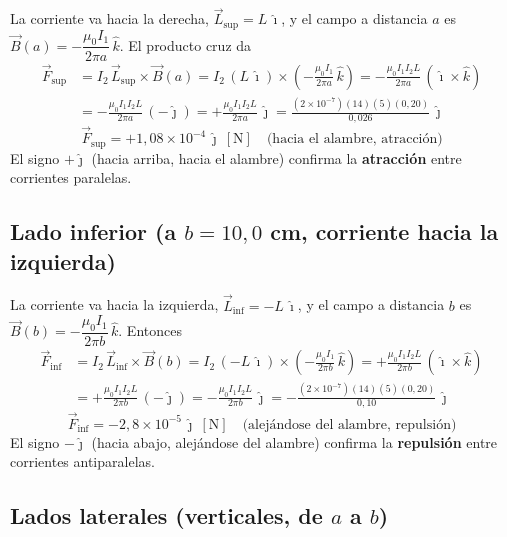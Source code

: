 \documentclass[12pt,letterpaper]{article}
\begin{document}
La corriente va hacia la derecha, $\vec{L}_{\text{sup}}=L\,\hat{\imath}$, y el campo a distancia
$a$ es $\vec{B}(a)=-\dfrac{\mu_0 I_1}{2\pi a}\,\hat{k}$. El producto cruz da
\begin{align*}
    \vec{F}_{\text{sup}} &= I_2\,\vec{L}_{\text{sup}}\times\vec{B}(a)
    = I_2\,(L\,\hat{\imath})\times\!\left(-\frac{\mu_0 I_1}{2\pi a}\,\hat{k}\right)
    = -\frac{\mu_0 I_1 I_2 L}{2\pi a}\,(\hat{\imath}\times\hat{k}) \\[2pt]
    &= -\frac{\mu_0 I_1 I_2 L}{2\pi a}\,(-\hat{\jmath})
    = +\frac{\mu_0 I_1 I_2 L}{2\pi a}\,\hat{\jmath}
    = \frac{(2\times10^{-7})(14)(5)(0{,}20)}{0{,}026}\,\hat{\jmath}
\end{align*}
\[
    \boxed{\vec{F}_{\text{sup}} = +1{,}08\times10^{-4}\,\hat{\jmath}\ [\text{N}]\quad\text{(hacia el alambre, atracci\'on)}}
\]
El signo $+\hat{\jmath}$ (hacia arriba, hacia el alambre) confirma la \textbf{atracci\'on} entre
corrientes paralelas.

\subsection*{Lado inferior (a $b=10{,}0$ cm, corriente hacia la izquierda)}

La corriente va hacia la izquierda, $\vec{L}_{\text{inf}}=-L\,\hat{\imath}$, y el campo a distancia
$b$ es $\vec{B}(b)=-\dfrac{\mu_0 I_1}{2\pi b}\,\hat{k}$. Entonces
\begin{align*}
    \vec{F}_{\text{inf}} &= I_2\,\vec{L}_{\text{inf}}\times\vec{B}(b)
    = I_2\,(-L\,\hat{\imath})\times\!\left(-\frac{\mu_0 I_1}{2\pi b}\,\hat{k}\right)
    = +\frac{\mu_0 I_1 I_2 L}{2\pi b}\,(\hat{\imath}\times\hat{k}) \\[2pt]
    &= +\frac{\mu_0 I_1 I_2 L}{2\pi b}\,(-\hat{\jmath})
    = -\frac{\mu_0 I_1 I_2 L}{2\pi b}\,\hat{\jmath}
    = -\frac{(2\times10^{-7})(14)(5)(0{,}20)}{0{,}10}\,\hat{\jmath}
\end{align*}
\[
    \boxed{\vec{F}_{\text{inf}} = -2{,}8\times10^{-5}\,\hat{\jmath}\ [\text{N}]\quad\text{(alej\'andose del alambre, repulsi\'on)}}
\]
El signo $-\hat{\jmath}$ (hacia abajo, alej\'andose del alambre) confirma la \textbf{repulsi\'on}
entre corrientes antiparalelas.

\subsection*{Lados laterales (verticales, de $a$ a $b$)}
\end{document}
